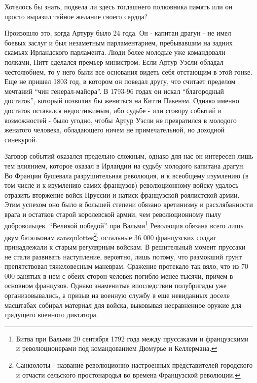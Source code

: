 \documentclass[
  oneside,
  12pt,
  titlepage]{book}
\begin{document}
Хотелось бы знать, подвела ли здесь тогдашнего полковника память или он просто выразил тайное желание своего сердца?

Произошло это, когда Артуру было 24 года. Он - капитан драгун - не имел боевых заслуг и был незаметным парламентарием, пребывавшим на задних скамьях Ирландского парламента. Люди более молодые уже командовали полками, Питт сделался премьер-министром. Если Артур Уэсли обладал честолюбием, то у него были все основания видеть себя отстающим в этой гонке. Еще не пришел 1803 год, в котором он поведал другу, что считает пределом мечтаний ``чин генерал-майора''. В 1793-96 годах он искал ``благородный достаток'', который позволил бы жениться на Китти Пакенэм. Однако именно достаток оставался недостижимым, ибо судьбе - или сговору событий и возможностей - было угодно, чтобы Артур Уэсли не превратился в молодого женатого человека, обладающего ничем не примечательной, но доходной синекурой.

Заговор событий оказался предельно сложным, однако для нас он интересен лишь тем влиянием, которое оказал в Ирландии на судьбу молодого капитана драгун. Во Франции бушевала разрушительная революция, и к всеобщему изумлению (в том числе и к изумлению самих французов) революционному войску удалось отразить вторжение войск Пруссии и натиск французской роялистской армии. Этим успехом оно было в большей степени обязано кретинизму и расхлябанности врага и остатков старой королевской армии, чем революционному пылу добровольцев. ``Великой победой'' при Вальми\footnote{Битва при Вальми 20 сентября 1792 года между пруссаками и французскими и революционерами под командованием Дюмурье и Келлермана.} Революция обязана всего лишь двум батальонам sansqulottes\footnote{Санкюлоты - название революционно настроенных представителей городского и отчасти сельского простонародья во времена Французской революции.}; остальные 36 000 французских солдат принадлежали к старым регулярным войскам. В решительный момент пруссаки не стали развивать наступление, вероятно, лишь потому, что размокший грунт препятствовал тяжеловесным маневрам. Сражение протекало так вяло, что из 70 000 занятых в нем с обеих сторон человек погибло менее тысячи, причем в основном французов. Однако знаменитые впоследствии полубригады уже организовывались, а призыв на военную службу в еще невиданных доселе масштабах собирал материал для войска, выковывая несравненное оружие для грядущего военного диктатора.
\end{document}
